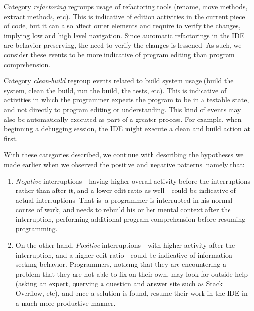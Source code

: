 \documentclass[times]{smrauth}
\newcommand\RR[1]{\textbf{Romain #1}}
\begin{document}
Category \emph{refactoring} regroups usage of refactoring tools (rename, move methods, extract methods, etc). This is indicative of edition activities in the current piece of code, but it can also affect outer elements and require to verify the changes, implying low and high level navigation. Since automatic refactorings in the IDE are behavior-preserving, the need to verify the changes is lessened. As such, we consider these events to be more indicative of program editing than program comprehension.

Category \emph{clean-build} regroup events related to build system usage (build the system, clean the build, run the build, the tests, etc). This is indicative of activities in which the programmer expects the program to be in a testable state, and not directly to program editing or understanding. This kind of events may also be automatically executed as part of a greater process. For example, when beginning a debugging session, the IDE might execute a clean and build action at first. 


With these categories described, we continue with describing the hypotheses we made earlier when we observed the positive and negative patterns, namely that:

\begin{enumerate}
\item \emph{Negative} interruptions---having higher overall activity before the interruptions rather than after it, and a lower edit ratio as well---could be indicative of actual interruptions. That is, a programmer is interrupted in his normal course of work, and needs to rebuild his or her mental context after the interruption, performing additional program comprehension before resuming programming.
\item On the other hand, \emph{Positive} interruptions---with higher activity after the interruption, and a higher edit ratio---could be indicative of information-seeking behavior. Programmers, noticing that they are encountering a problem that they are not able to fix on their own, may look for outside help (asking an expert, querying a question and answer site such as Stack Overflow, etc), and once a solution is found, resume their work in the IDE in a much more productive manner.
\end{enumerate}
\end{document}
